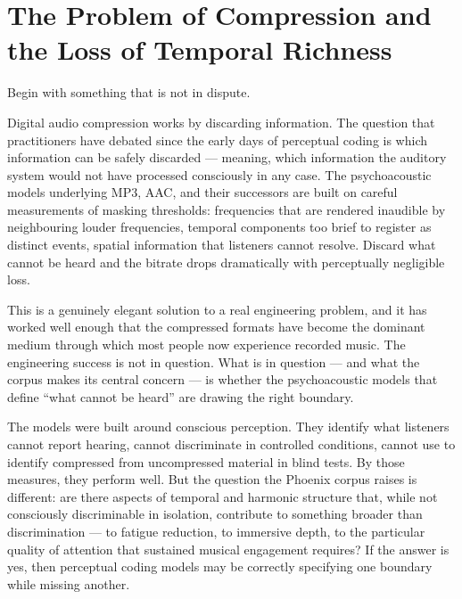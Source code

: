 
\chapter{The Problem of Compression and the Loss of Temporal Richness}
\label{ch:compression-loss}


\noindent
Begin with something that is not in dispute.

Digital audio compression works by discarding information. The
question that practitioners have debated since the early days of
perceptual coding is which information can be safely discarded ---
meaning, which information the auditory system would not have
processed consciously in any case. The psychoacoustic models
underlying MP3, AAC, and their successors are built on careful
measurements of masking thresholds: frequencies that are rendered
inaudible by neighbouring louder frequencies, temporal components
too brief to register as distinct events, spatial information that
listeners cannot resolve. Discard what cannot be heard and the
bitrate drops dramatically with perceptually negligible loss.

This is a genuinely elegant solution to a real engineering problem,
and it has worked well enough that the compressed formats have become
the dominant medium through which most people now experience recorded
music. The engineering success is not in question. What is in question
--- and what the \Phoenix{} corpus makes its central concern --- is
whether the psychoacoustic models that define \enquote{what cannot be
heard} are drawing the right boundary.

The models were built around conscious perception. They identify what
listeners cannot report hearing, cannot discriminate in controlled
conditions, cannot use to identify compressed from uncompressed
material in blind tests. By those measures, they perform well. But
the question the Phoenix corpus raises is different: are there aspects
of temporal and harmonic structure that, while not consciously
discriminable in isolation, contribute to something broader than
discrimination --- to fatigue reduction, to immersive depth, to the
particular quality of attention that sustained musical engagement
requires? If the answer is yes, then perceptual coding models may
be correctly specifying one boundary while missing another.


